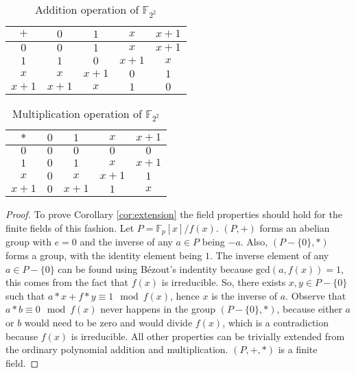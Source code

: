 \documentclass{ufsctex/ufsctex}
\begin{document}
\begin{table}
\begin{center}
\begin{tabular}{c|cccc}
$+$   & $0$   & $1$   & $x$   & $x+1$ \\
\hline
$0$   & $0$   & $1$   & $x$   & $x+1$ \\
$1$   & $1$   & $0$   & $x+1$ & $x$   \\
$x$   & $x$   & $x+1$ & $0$   & $1$   \\
$x+1$ & $x+1$ & $x$   & $1$   & $0$   \\
\end{tabular}
\caption{Addition operation of $\mathbb{F}_{2^2}$}
\label{tab:addition}
\end{center}
\end{table}

\begin{table}
\begin{center}
\begin{tabular}{c|cccc}
$*$   & $0$ & $1$   & $x$   & $x+1$ \\
\hline
$0$   & $0$ & $0$   & $0$   & $0$   \\
$1$   & $0$ & $1$   & $x$   & $x+1$ \\
$x$   & $0$ & $x$   & $x+1$ & $1$   \\
$x+1$ & $0$ & $x+1$ & $1$   & $x$   \\
\end{tabular}
\caption{Multiplication operation of $\mathbb{F}_{2^2}$}
\label{tab:multiplication}
\end{center}
\end{table}

\begin{proof}
To prove Corollary \ref{cor:extension} the field properties should hold for the
finite fields of this fashion. Let $P = \mathbb{F}_p[x]/f(x)$. $(P, +)$ forms
an abelian group with $e = 0$ and the inverse of any $a \in P$ being $-a$.
Also, $(P - \{0\}, *)$ forms a group, with the identity element being $1$. The
inverse element of any $a \in P - \{0\}$ can be found using Bézout's indentity
because $\text{gcd}(a, f(x)) = 1$, this comes from the fact that $f(x)$ is
irreducible. So, there exists $x, y \in P - \{0\}$ such that $a*x + f*y \equiv
1 \mod f(x)$, hence $x$ is the inverse of $a$. Observe that $a*b \equiv 0 \mod
f(x)$ never happens in the group $(P - \{0\}, *)$, because either $a$ or $b$
would need to be zero and would divide $f(x)$, which is a contradiction because
$f(x)$ is irreducible. All other properties can be trivially extended from the
ordinary polynomial addition and multiplication. $(P, +, *)$ is a finite field.
\end{proof}
\end{document}
